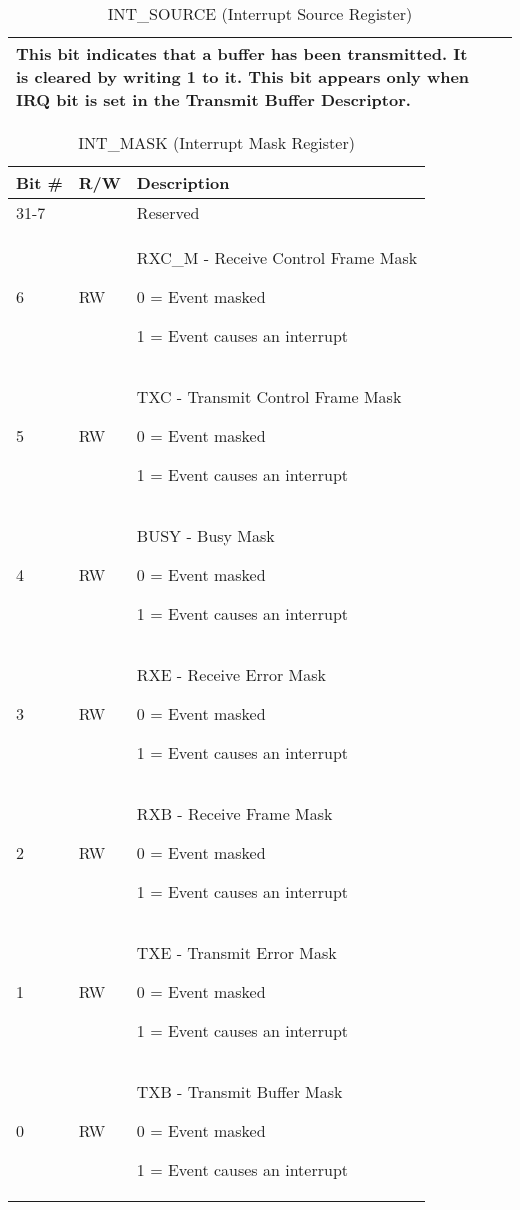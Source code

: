 \begin{table}[H]
\begin{tabularx}{\textwidth}{|l|l|X|}
                This bit indicates that a buffer has been transmitted. It is
                cleared by writing 1 to it. This bit appears only when IRQ bit
                is set in the Transmit Buffer Descriptor.\\ \hline
  \end{tabularx}
    \caption{INT\_SOURCE (Interrupt Source Register)}
  \label{swreg_details:int_source}
\end{table}

\begin{table}[H]
  \centering
  \begin{tabularx}{\textwidth}{|l|l|X|}
    
    \hline
    \rowcolor{iob-green}
    {\bf Bit \#} & {\bf R/W} & {\bf Description} \\ \hline

    31-7   &   & Reserved \\ \hline
    \rowcolor{iob-blue}
    6      & RW & RXC\_M - Receive Control Frame Mask
                
                0 = Event masked

                1 = Event causes an interrupt \\ \hline
    5      & RW & TXC - Transmit Control Frame Mask

                0 = Event masked

                1 = Event causes an interrupt \\ \hline
    \rowcolor{iob-blue}
    4      & RW & BUSY - Busy Mask

                0 = Event masked

                1 = Event causes an interrupt \\ \hline
    3      & RW & RXE - Receive Error Mask

                0 = Event masked

                1 = Event causes an interrupt \\ \hline
    \rowcolor{iob-blue}
    2      & RW & RXB - Receive Frame Mask

                0 = Event masked

                1 = Event causes an interrupt \\ \hline
   1      & RW & TXE - Transmit Error Mask

                0 = Event masked

                1 = Event causes an interrupt \\ \hline
    \rowcolor{iob-blue}
    0      & RW & TXB - Transmit Buffer Mask

                0 = Event masked

                1 = Event causes an interrupt \\ \hline
  \end{tabularx}
    \caption{INT\_MASK (Interrupt Mask Register)}
  \label{swreg_details:int_mask}
\end{table}

